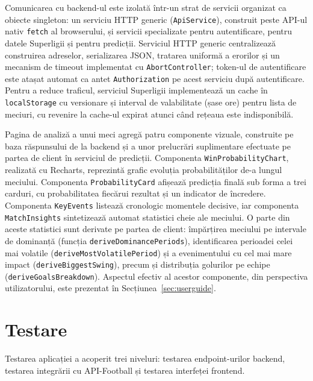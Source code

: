 Comunicarea cu backend-ul este izolată într-un strat de servicii organizat
ca obiecte singleton: un serviciu HTTP generic (\texttt{ApiService}),
construit peste API-ul nativ \texttt{fetch} al browserului, și servicii
specializate pentru autentificare, pentru datele Superligii și pentru
predicții. Serviciul HTTP generic centralizează construirea adreselor,
serializarea JSON, tratarea uniformă a erorilor și un mecanism de timeout
implementat cu \texttt{AbortController}; token-ul de autentificare este
atașat automat ca antet \texttt{Authorization} pe acest serviciu după
autentificare. Pentru a reduce traficul, serviciul Superligii implementează
un cache în \texttt{localStorage} cu versionare și interval de valabilitate
(șase ore) pentru lista de meciuri, cu revenire la cache-ul expirat atunci
când rețeaua este indisponibilă.

Pagina de analiză a unui meci agregă patru componente vizuale, construite pe
baza răspunsului de la backend și a unor prelucrări suplimentare efectuate
pe partea de client în serviciul de predicții. Componenta
\texttt{WinProbabilityChart}, realizată cu Recharts, reprezintă grafic
evoluția probabilităților de-a lungul meciului. Componenta
\texttt{ProbabilityCard} afișează predicția finală sub forma a trei carduri,
cu probabilitatea fiecărui rezultat și un indicator de încredere. Componenta
\texttt{KeyEvents} listează cronologic momentele decisive, iar componenta
\texttt{MatchInsights} sintetizează automat statistici cheie ale meciului.
O parte din aceste statistici sunt derivate pe partea de client: împărțirea
meciului pe intervale de dominanță (funcția \texttt{deriveDominancePeriods}),
identificarea perioadei celei mai volatile (\texttt{deriveMostVolatilePeriod})
și a evenimentului cu cel mai mare impact (\texttt{deriveBiggestSwing}),
precum și distribuția golurilor pe echipe (\texttt{deriveGoalsBreakdown}).
Aspectul efectiv al acestor componente, din perspectiva utilizatorului, este
prezentat în Secțiunea~\ref{sec:userguide}.

\section{Testare}
\label{sec:testing}

Testarea aplicației a acoperit trei niveluri: testarea endpoint-urilor
backend, testarea integrării cu API-Football și testarea interfeței
frontend.


